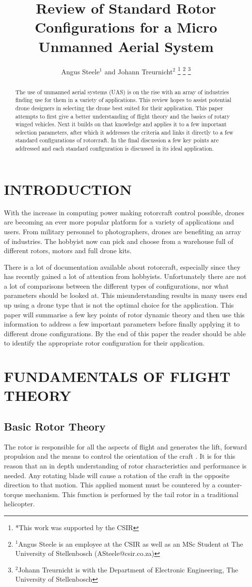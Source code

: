\documentclass[a4paper, 10pt, conference]{ieeeconf}
\title{\LARGE \bf
Review of Standard Rotor Configurations for a Micro Unmanned Aerial System
}
\author{Angus Steele$^{1}$ and Johann Treurnicht$^{2}$%
\thanks{*This work was supported by the CSIR}%
\thanks{$^{1}$Angus Steele is an employee at the CSIR as well as an MSc Student at The University of Stellenbosch (ASteele@csir.co.za)}%
\thanks{$^{2}$Johann Treurnicht is with the Department of Electronic Engineering, The University of Stellenbosch}%
}
\begin{document}
\maketitle

\begin{abstract}
The use of unmanned aerial systems (UAS) is on the rise with an array of industries finding use for them in a variety of applications. This review hopes to assist potential drone designers in selecting the drone best suited for their application. This paper attempts to first give a better understanding of flight theory and the basics of rotary winged vehicles. Next it builds on that knowledge and applies it to a few important selection parameters, after which it addresses the criteria and links it directly to a few standard configurations of rotorcraft. In the final discussion a few key points are addressed and each standard configuration is discussed in its ideal application.
\end{abstract}
\section{INTRODUCTION}
With the increase in computing power making rotorcraft control possible, drones are becoming an ever more popular platform for a variety of applications and users. From military personnel to photographers, drones are benefiting an array of industries. The hobbyist now can pick and choose from a warehouse full of different rotors, motors and full drone kits. 

There is a lot of documentation available about rotorcraft, especially since they has recently gained a lot of attention from hobbyists. Unfortunately there are not a lot of comparisons between the different types of configurations, nor what parameters should be looked at. This misunderstanding results in many users end up using a drone type that is not the optimal choice for the application. This paper will summarise a few key points of rotor dynamic theory and then use this information to address a few important parameters before finally applying it to different drone configurations. By the end of this paper the reader should be able to identify the appropriate rotor configuration for their application.

\section{FUNDAMENTALS OF FLIGHT THEORY}

\subsection{Basic Rotor Theory}
The rotor is responsible for all the aspects of flight and generates the lift, forward propulsion and the means to control the orientation of the craft \cite{Leishman}. It is for this reason that an in depth understanding of rotor characteristics and performance is needed. Any rotating blade will cause a rotation of the craft in the opposite direction to that motion. This applied moment must be countered by a counter-torque mechanism. This function is performed by the tail rotor in a traditional helicopter.
\end{document}
